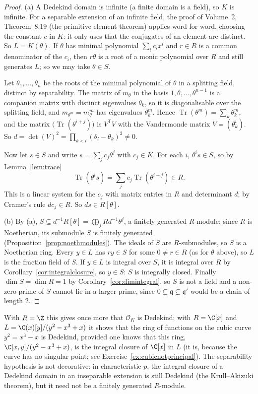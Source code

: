 \begin{proof}
(a) A Dedekind domain is infinite (a finite domain is a field), so $K$ is infinite. For a separable extension of an infinite field, the proof of Volume~2, Theorem~8.19 (the primitive element theorem) applies word for word,
choosing the constant $c$ in $K$: it only uses that the conjugates of an element are distinct. So $L=K(\theta)$. If $\theta$ has minimal polynomial $\sum_ic_ix^i$ and $r\in R$ is a common denominator of the $c_i$, then
$r\theta$ is a root of a monic polynomial over $R$ and still generates $L$; so we may take $\theta\in S$.

Let $\theta_1,\dots,\theta_n$ be the roots of the minimal polynomial of $\theta$ in a splitting field, distinct by separability. The matrix of $m_\theta$ in the basis $1,\theta,\dots,\theta^{n-1}$ is a companion matrix with distinct
eigenvalues $\theta_k$, so it is diagonalisable over the splitting field, and $m_{\theta^m}=m_\theta^m$ has eigenvalues $\theta_k^m$. Hence $\operatorname{Tr}(\theta^m)=\sum_k\theta_k^m$, and the matrix
$\bigl(\operatorname{Tr}(\theta^{i+j})\bigr)$ is $V^{\mathsf T}V$ with the Vandermonde matrix $V=(\theta_k^i)$. So $d=\det(V)^2=\prod_{k<l}(\theta_l-\theta_k)^2\ne0$.

Now let $s\in S$ and write $s=\sum_jc_j\theta^j$ with $c_j\in K$. For each $i$, $\theta^is\in S$, so by Lemma~\ref{lem:trace}
\[
\operatorname{Tr}(\theta^is)=\sum_jc_j\operatorname{Tr}(\theta^{i+j})\in R .
\]
This is a linear system for the $c_j$ with matrix entries in $R$ and determinant $d$; by Cramer's rule $dc_j\in R$. So $ds\in R[\theta]$.

(b) By (a), $S\subseteq d^{-1}R[\theta]=\bigoplus_jRd^{-1}\theta^j$, a finitely generated $R$-module; since $R$ is Noetherian, its submodule $S$ is finitely generated (Proposition~\ref{prop:noethmodules}). The ideals of $S$ are
$R$-submodules, so $S$ is a Noetherian ring. Every $y\in L$ has $ry\in S$ for some $0\ne r\in R$ (as for $\theta$ above), so $L$ is the fraction field of $S$. If $y\in L$ is integral over $S$, it is integral over $R$ by
Corollary~\ref{cor:integralclosure}, so $y\in S$: $S$ is integrally closed. Finally $\dim S=\dim R=1$ by Corollary~\ref{cor:dimintegral}, so $S$ is not a field and a non-zero prime of $S$ cannot lie in a larger prime, since
$0\subsetneq\mathfrak q\subsetneq\mathfrak q'$ would be a chain of length $2$.
\end{proof}

With $R=\Z$ this gives once more that $\mathcal O_K$ is Dedekind; with $R=\C[x]$ and $L=\C(x)[y]/(y^2-x^3+x)$ it shows that the ring of functions on the cubic curve $y^2=x^3-x$ is Dedekind, provided one knows that this
ring, $\C[x,y]/(y^2-x^3+x)$, is the integral closure of $\C[x]$ in $L$ (it is, because the curve has no singular point; see Exercise~\ref{ex:cubicnotprincipal}). The separability hypothesis is not decorative: in characteristic $p$, the
integral closure of a Dedekind domain in an inseparable extension is still Dedekind (the Krull--Akizuki theorem), but it need not be a finitely generated $R$-module.

